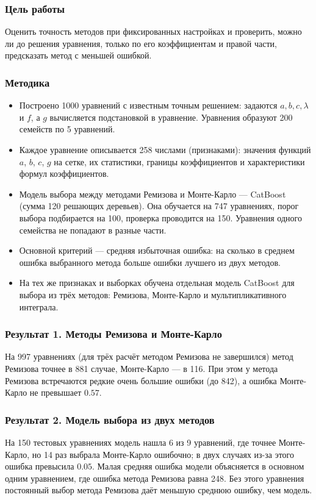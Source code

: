 \documentclass[14pt,a4paper]{extarticle}
\begin{document}
\subsubsection*{Цель работы}
Оценить точность методов при фиксированных настройках и проверить,
можно ли до решения уравнения, только по его коэффициентам и правой
части, предсказать метод с меньшей ошибкой.

\subsubsection*{Методика}
\begin{itemize}
\item Построено 1000 уравнений с известным точным решением: задаются
$a,b,c,\lambda$ и $f$, а $g$ вычисляется подстановкой в уравнение.
Уравнения образуют 200 семейств по 5 уравнений.
\item Каждое уравнение описывается 258 числами (признаками): значения
функций $a$, $b$, $c$, $g$ на сетке, их статистики, границы коэффициентов
и характеристики формул коэффициентов.
\item Модель выбора между методами Ремизова и Монте-Карло --- CatBoost
(сумма 120 решающих деревьев). Она обучается на 747 уравнениях, порог
выбора подбирается на 100, проверка проводится на 150. Уравнения одного
семейства не попадают в разные части.
\item Основной критерий --- средняя избыточная ошибка: на сколько
в среднем ошибка выбранного метода больше ошибки лучшего из двух методов.
\item На тех же признаках и выборках обучена отдельная модель CatBoost
для выбора из трёх методов: Ремизова, Монте-Карло и мультипликативного
интеграла.
\end{itemize}

\subsubsection*{Результат 1. Методы Ремизова и Монте-Карло}
На 997 уравнениях (для трёх расчёт методом Ремизова не завершился)
метод Ремизова точнее в 881 случае, Монте-Карло --- в 116. При этом
у метода Ремизова встречаются редкие очень большие ошибки (до 842),
а ошибка Монте-Карло не превышает $0.57$.

\subsubsection*{Результат 2. Модель выбора из двух методов}
На 150 тестовых уравнениях модель нашла 6 из 9 уравнений, где точнее
Монте-Карло, но 14 раз выбрала Монте-Карло ошибочно; в двух случаях
из-за этого ошибка превысила $0.05$. Малая средняя ошибка модели
объясняется в основном одним уравнением, где ошибка метода Ремизова
равна 248. Без этого уравнения постоянный выбор метода Ремизова даёт
меньшую среднюю ошибку, чем модель.
\end{document}
